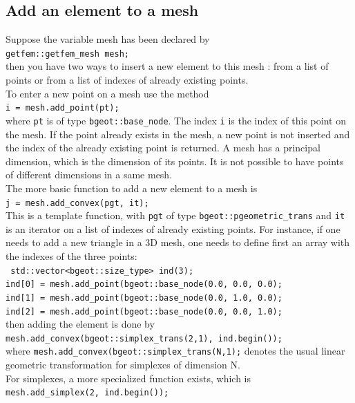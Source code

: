\documentclass[11pt,a4paper]{article}
\begin{document}
\subsection{Add an element to a mesh}
Suppose the variable mesh has been declared by\\[0.5cm]
{\tt getfem::getfem\_mesh mesh;}\\[0.5cm]
then you have two ways to insert a new element to this mesh : from a list of points or from a list of indexes of already existing points.\\[0.5cm]
To enter a new point on a mesh use the method\\[0.5cm]
{\tt i = mesh.add\_point(pt);}\\[0.5cm]
where {\tt pt} is of type {\tt bgeot::base\_node}. The index {\tt i} is the index of this point on the mesh. If the point already exists in the mesh, a new point is not inserted and the index of the already existing point is returned. A mesh has a principal dimension, which is the dimension of its points. It is not possible to have points of different dimensions in a same mesh.\\[0.5cm]
The more basic function to add a new element to a mesh is\\[0.5cm]
{\tt j = mesh.add\_convex(pgt, it);}\\[0.5cm]
This is a template function, with {\tt pgt} of type {\tt bgeot::pgeometric\_trans} and {\tt it} is an iterator on a list of indexes of already existing points. For instance, if one needs to add a new triangle in a 3D mesh, one needs to define first an array with the indexes of the three points:\\[0.5cm]
{\tt 
  std::vector<bgeot::size\_type> ind(3); \\
  ind[0] = mesh.add\_point(bgeot::base\_node(0.0, 0.0, 0.0);\\
  ind[1] = mesh.add\_point(bgeot::base\_node(0.0, 1.0, 0.0);\\
  ind[2] = mesh.add\_point(bgeot::base\_node(0.0, 0.0, 1.0);
}\\[0.5cm]
then adding the element is done by\\[0.5cm]
{\tt mesh.add\_convex(bgeot::simplex\_trans(2,1), ind.begin()); }\\[0.5cm]
where {\tt mesh.add\_convex(bgeot::simplex\_trans(N,1);} denotes the usual linear geometric transformation for simplexes of dimension N.\\[0.5cm]
For simplexes, a more specialized function exists, which is\\[0.5cm]
{\tt mesh.add\_simplex(2, ind.begin()); }\\[0.5cm]
\end{document}
